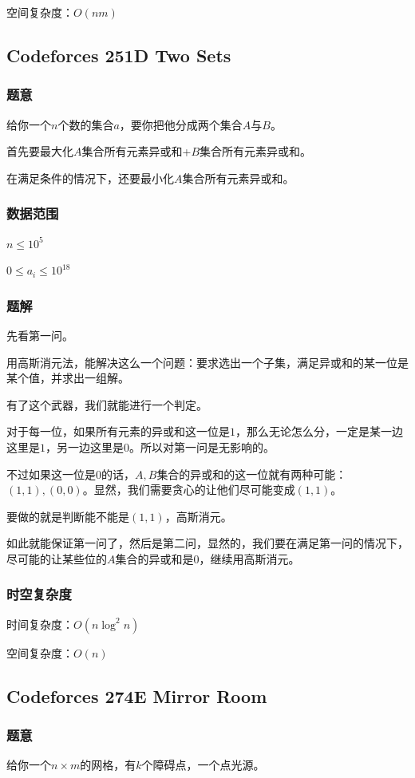 \documentclass{ctexart}
\begin{document}
空间复杂度：$O(nm)$
\subsection{Codeforces 251D Two Sets}
\subsubsection{题意}
给你一个$n$个数的集合$a$，要你把他分成两个集合$A$与$B$。

首先要最大化$A$集合所有元素异或和+$B$集合所有元素异或和。

在满足条件的情况下，还要最小化$A$集合所有元素异或和。
\subsubsection{数据范围}
$n \le 10^5$

$0 \le a_i \le 10^{18}$
\subsubsection{题解}
先看第一问。

用高斯消元法，能解决这么一个问题：要求选出一个子集，满足异或和的某一位是某个值，并求出一组解。

有了这个武器，我们就能进行一个判定。

对于每一位，如果所有元素的异或和这一位是$1$，那么无论怎么分，一定是某一边这里是$1$，另一边这里是$0$。所以对第一问是无影响的。

不过如果这一位是$0$的话，$A,B$集合的异或和的这一位就有两种可能：$(1,1),(0,0)$。显然，我们需要贪心的让他们尽可能变成$(1,1)$。

要做的就是判断能不能是$(1,1)$，高斯消元。

如此就能保证第一问了，然后是第二问，显然的，我们要在满足第一问的情况下，尽可能的让某些位的$A$集合的异或和是$0$，继续用高斯消元。
\subsubsection{时空复杂度}
时间复杂度：$O(n \log^2 n)$

空间复杂度：$O(n)$
\subsection{Codeforces 274E Mirror Room}
\subsubsection{题意}
给你一个$n \times m$的网格，有$k$个障碍点，一个点光源。
\end{document}
